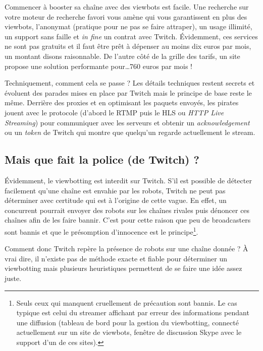 \documentclass[a4paper]{article}
\begin{document}
Commencer à booster sa chaîne avec des viewbots est facile. Une recherche sur votre moteur de recherche favori vous amène qui vous garantissent en plus des viewbots, l'anonymat (pratique pour ne pas se faire attraper), un usage illimité, un support sans faille et \textit{in fine} un contrat avec Twitch. Évidemment, ces services ne sont pas gratuits et il faut être prêt à dépenser au moins dix euros par mois, un montant disons raisonnable. De l'autre côté de la grille des tarifs, un site propose une solution performante pour\ldots 760 euros par mois\cite{TropCher} ! 

Techniquement, comment cela se passe ? Les détails techniques restent secrets et évoluent des parades mises en place par Twitch mais le principe de base reste le même. Derrière des proxies et en optimisant les paquets envoyés, les pirates jouent avec le protocole (d'abord le RTMP puis le HLS ou \textit{HTTP Live Streaming}) pour communiquer avec les serveurs et obtenir un \textit{acknowledgement} ou un \textit{token} de Twitch qui montre que quelqu'un regarde actuellement le stream. 

\subsection{Mais que fait la police (de Twitch) ?}

Évidemment, le viewbotting est interdit sur Twitch. S'il est possible de détecter facilement qu'une chaîne est envahie par les robots, Twitch ne peut pas déterminer avec certitude qui est à l'origine de cette vague. En effet, un concurrent pourrait envoyer des robots sur les chaînes rivales puis dénoncer ces chaînes afin de les faire bannir. C'est pour cette raison que peu de broadcasters sont bannis et que le présomption d'innocence est le principe\footnote{Seuls ceux qui manquent cruellement de précaution sont bannis. Le cas typique est celui du streamer affichant par erreur des informations pendant une diffusion (tableau de bord pour la gestion du viewbotting, connecté actuellement sur un site de viewbots, fenêtre de discussion Skype avec le support d'un de ces sites).}. 

Comment donc Twitch repère la présence de robots sur une chaîne donnée ? À vrai dire, il n'existe pas de méthode exacte et fiable pour déterminer un viewbotting mais plusieurs heuristiques permettent de se faire une idée assez juste. 
\end{document}

